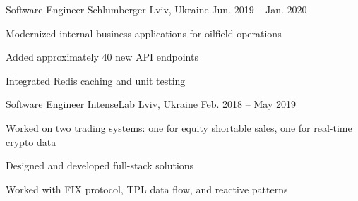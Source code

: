 \begin{cventries}
  \cventry
    {Software Engineer} %
    {Schlumberger} %
    {Lviv, Ukraine} %
    {Jun. 2019 – Jan. 2020} %
    {
      \begin{cvitems} %
        \item {Modernized internal business applications for oilfield operations}
        \item {Added approximately 40 new API endpoints}
        \item {Integrated Redis caching and unit testing}
      \end{cvitems}
    }

  \cventry
    {Software Engineer} %
    {IntenseLab} %
    {Lviv, Ukraine} %
    {Feb. 2018 – May 2019} %
    {
      \begin{cvitems} %
        \item {Worked on two trading systems: one for equity shortable sales, one for real-time crypto data}
        \item {Designed and developed full-stack solutions}
        \item {Worked with FIX protocol, TPL data flow, and reactive patterns}
      \end{cvitems}
    }

\end{cventries}
